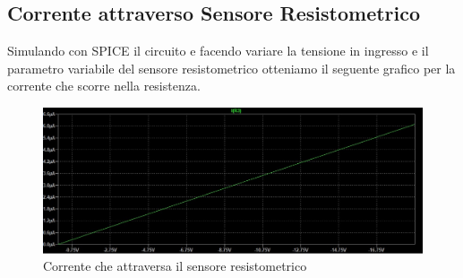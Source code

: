 \subsection{Corrente attraverso Sensore Resistometrico}\label{subsec:correnteSensoreResistometrico}
Simulando con SPICE il circuito e facendo variare la tensione in ingresso e il parametro variabile del sensore resistometrico otteniamo il seguente grafico per la corrente che scorre nella resistenza.
\begin{figure}[h]
    \centering
    \includegraphics[width=1\textwidth]{Figure/UscitaCorrente.jpg}
    \caption{Corrente che attraversa il sensore resistometrico}
    \label{fig:correnteSensoreResistometrico}
\end{figure}
